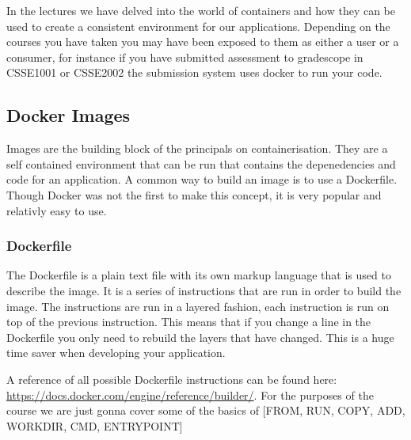 \documentclass{csse4400}
\begin{document}
In the lectures we have delved into the world of containers and how they can be used to create a consistent environment for our applications. Depending on the courses you have taken you may have been exposed to them as either a user or a consumer, for instance if you have submitted assessment to gradescope in CSSE1001 or CSSE2002 the submission system uses docker to run your code.\\



\subsection{Docker Images}

Images are the building block of the principals on containerisation. They are a self contained environment that can be run that contains the depenedencies and code for an application. A common way to build an image is to use a Dockerfile. Though Docker was not the first to make this concept, it is very popular and relativly easy to use.

\subsubsection{Dockerfile}

The Dockerfile is a plain text file with its own markup language that is used to describe the image. It is a series of instructions that are run in order to build the image. The instructions are run in a layered fashion, each instruction is run on top of the previous instruction. This means that if you change a line in the Dockerfile you only need to rebuild the layers that have changed. This is a huge time saver when developing your application.

A reference of all possible Dockerfile instructions can be found here: \url{https://docs.docker.com/engine/reference/builder/}. For the purposes of the course we are just gonna cover some of the basics of [FROM, RUN, COPY, ADD, WORKDIR, CMD, ENTRYPOINT]
\end{document}
